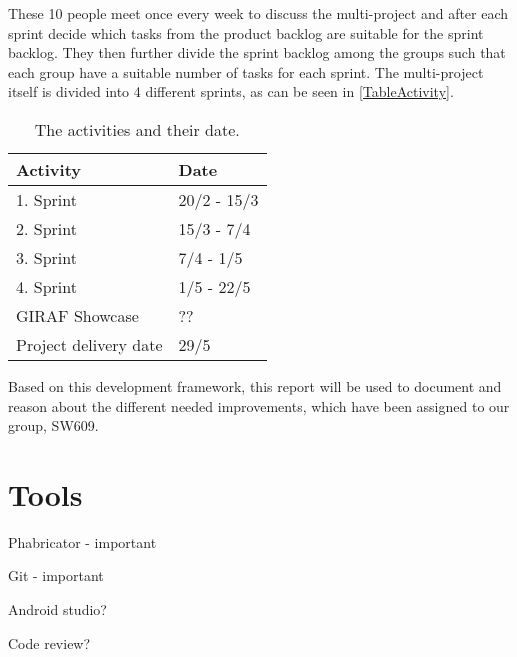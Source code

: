 
These 10 people meet once every week to discuss the multi-project and after each
sprint decide which tasks from the product backlog are suitable for the sprint
backlog. They then further divide the sprint backlog among the groups such that
each group have a suitable number of tasks for each sprint. The multi-project
itself is divided into 4 different sprints, as can be seen in
\autoref{TableActivity}. 

\begin{table}[H]
\centering
\begin{tabular}{|l|l|}
\hline
Activity & Date \\ \hline
1. Sprint & 20/2 - 15/3 \\\hline 
2. Sprint & 15/3 - 7/4\\\hline 
3. Sprint & 7/4 - 1/5\\\hline 
4. Sprint & 1/5 - 22/5\\\hline 
GIRAF Showcase & ??\\\hline
Project delivery date & 29/5\\\hline
\end{tabular}
\caption{The activities and their date.}
\label{TableActivity}
\end{table}

Based on this development framework, this report will be used to document and
reason about the different needed improvements, which have been assigned to our
group, SW609.


\section{Tools}

Phabricator - important

Git - important

Android studio?

Code review?
